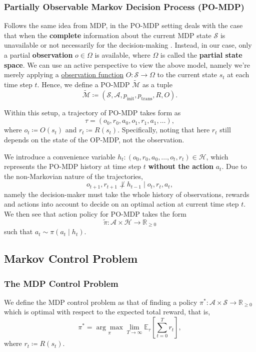 \documentclass{article}
\begin{document}
\subsubsection{Partially Observable Markov Decision Process (PO-MDP)}
Follows the same idea from MDP, in the PO-MDP setting deals with the case that when the \textbf{complete} information about the current MDP state \(\mathcal{S}\) is unavailable
or not necessarily for the decision-making \cite{ASTROM1965174}. Instead, in our case, only a partial \textbf{observation} \(o\in \Omega\) is available, where \(\Omega\) is called the
\textbf{partial state space}. We can use an active perspective to view the above model, namely we're merely applying a \underline{observation function}
\(O\colon \mathcal{S}\to \Omega\) to the current state \(s_t\) at each time step \(t\).  Hence, we define a PO-MDP \(\widetilde{\mathcal{M}}\) as a tuple
\[
	\widetilde{\mathcal{M}} \coloneqq (\mathcal{S}, \mathcal{A}, p_{\mathrm{init}}, p_{\mathrm{trans}}, R, O).
\]

Within this setup, a trajectory of PO-MDP takes form as
\[
	\tau = (o_0, r_0, a_0, o_1, r_1, a_1, \ldots),
\]
where \(o_t\coloneqq O(s_t)\) and \(r_t\coloneqq R(s_t)\). Specifically, noting that here \(r_t\) still depends on the state of the OP-MDP, not the observation.

We introduce a convenience variable \(h_t\colon (o_0, r_0, a_0, \ldots, o_t, r_t)\in \mathcal{H}\), which represents the PO-MDP history at time step \(t\) \textbf{without the
	action} \(a_t\).  Due to the non-Markovian nature of the trajectories,
\[
	o_{t+1}, r_{t+1}\not\perp h_{t-1} \mid o_t,r_t,a_t,
\]
namely the decision-maker must take the whole history of observations, rewards and actions into account to decide on an optimal action at current time step \(t\). We then see
that action policy for PO-MDP takes the form
\[
	\widetilde{\pi}\colon \mathcal{A}\times \mathcal{H}\to \mathbb{R}_{\geq 0}
\]
such that \(a_t\sim \pi (a_t\mid h_t)\).

\subsection{Markov Control Problem}
\subsubsection{The MDP Control Problem} We define the MDP control problem as that of finding a policy \(\pi ^\ast\colon \mathcal{A}\times \mathcal{S}\to \mathbb{R}_{\geq 0}\)
which is optimal with respect to the expected total reward, that is,
\[
	\pi^\ast = \underset{\pi}{\arg\max} \lim_{T\to \infty}\mathbb{E}_\tau\left[\sum_{t=0}^T r_t\right],
\]
where \(r_t\coloneqq R(s_t)\).
\end{document}

